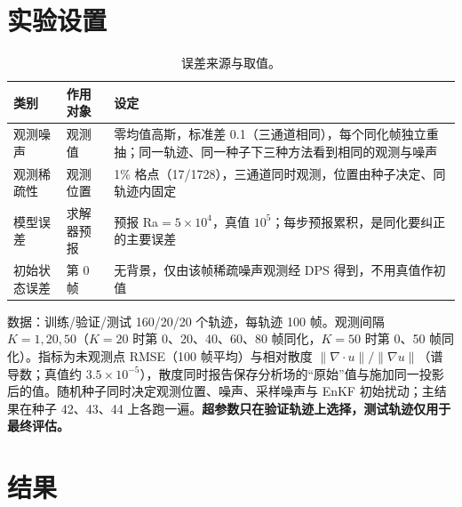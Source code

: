 \documentclass[10.5pt,a4paper]{article}
\begin{document}
\section{实验设置}
\begin{table}[H]\centering\small\caption{误差来源与取值。}
\begin{tabular}{p{2.1cm}p{2.3cm}p{7.6cm}}\toprule
类别 & 作用对象 & 设定\\\midrule
观测噪声 & 观测值 & 零均值高斯，标准差 0.1（三通道相同），每个同化帧独立重抽；同一轨迹、同一种子下三种方法看到相同的观测与噪声\\
观测稀疏性 & 观测位置 & 1\% 格点（17/1728），三通道同时观测，位置由种子决定、同轨迹内固定\\
模型误差 & 求解器预报 & 预报 Ra$=5\times10^4$，真值 $10^5$；每步预报累积，是同化要纠正的主要误差\\
初始状态误差 & 第 0 帧 & 无背景，仅由该帧稀疏噪声观测经 DPS 得到，不用真值作初值\\\bottomrule
\end{tabular}\end{table}
数据：训练/验证/测试 160/20/20 个轨迹，每轨迹 100 帧。观测间隔 $K=1,20,50$（$K=20$ 时第 0、20、40、60、80 帧同化，$K=50$ 时第 0、50 帧同化）。指标为未观测点 RMSE（100 帧平均）与相对散度 $\|\nabla\!\cdot u\|/\|\nabla u\|$（谱导数；真值约 $3.5\times10^{-5}$），散度同时报告保存分析场的``原始''值与施加同一投影后的值。随机种子同时决定观测位置、噪声、采样噪声与 EnKF 初始扰动；主结果在种子 42、43、44 上各跑一遍。\textbf{超参数只在验证轨迹上选择，测试轨迹仅用于最终评估。}

\section{结果}
\end{document}
